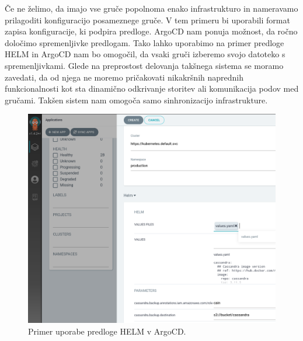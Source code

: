 \documentclass[a4paper, 12pt]{book}
\begin{document}
Če ne želimo, da imajo vse gruče popolnoma enako infrastrukturo in nameravamo prilagoditi konfiguracijo posameznege gruče.
V tem primeru bi uporabili format zapisa konfiguracije, ki podpira predloge.
ArgoCD nam ponuja možnost, da ročno določimo spremenljivke predlogam.
Tako lahko uporabimo na primer predloge HELM in ArgoCD nam bo omogočil, da vsaki gruči izberemo svojo datoteko s spremenljivkami.
Glede na preprostost delovanja takšnega sistema se moramo zavedati, da od njega ne moremo pričakovati nikakršnih naprednih funkcionalnosti kot sta dinamično odkrivanje storitev ali komunikacija podov med gručami.
Takšen sistem nam omogoča samo sinhronizacijo infrastrukture.

\begin{figure}[h]
\begin{center}
\includegraphics[width=1.0\textwidth]{images/primer-uporabe-helm-predloge-argo-cd.png}
\end{center}
\caption{Primer uporabe predloge HELM v ArgoCD.}
\label{primer-uporabe-helm-predloge-argo-cd}
\end{figure}
\end{document}

